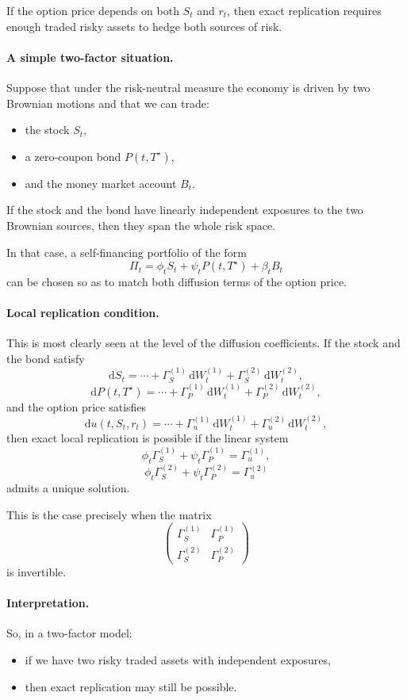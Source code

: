 \documentclass[11pt]{article}
\theoremstyle{plain}
\theoremstyle{definition}
\theoremstyle{remark}
\begin{document}
If the option price depends on both \(S_t\) and \(r_t\), then exact
replication requires enough traded risky assets to hedge both sources of
risk.

\paragraph{A simple two-factor situation.}
Suppose that under the risk-neutral measure the economy is driven by two
Brownian motions and that we can trade:
\begin{itemize}[leftmargin=1.4em]
    \item the stock \(S_t\),
    \item a zero-coupon bond \(P(t,T^\star)\),
    \item and the money market account \(B_t\).
\end{itemize}

If the stock and the bond have linearly independent exposures to the two
Brownian sources, then they span the whole risk space.

In that case, a self-financing portfolio of the form
\[
\Pi_t=\phi_t S_t+\psi_t P(t,T^\star)+\beta_t B_t
\]
can be chosen so as to match both diffusion terms of the option price.

\paragraph{Local replication condition.}
This is most clearly seen at the level of the diffusion coefficients.
If the stock and the bond satisfy
\[
\mathrm{d}S_t=\cdots+\Gamma_S^{(1)}\,\mathrm{d}W_t^{(1)}+\Gamma_S^{(2)}\,\mathrm{d}W_t^{(2)},
\]
\[
\mathrm{d}P(t,T^\star)=\cdots+\Gamma_P^{(1)}\,\mathrm{d}W_t^{(1)}+\Gamma_P^{(2)}\,\mathrm{d}W_t^{(2)},
\]
and the option price satisfies
\[
\mathrm{d}u(t,S_t,r_t)=\cdots+\Gamma_u^{(1)}\,\mathrm{d}W_t^{(1)}+\Gamma_u^{(2)}\,\mathrm{d}W_t^{(2)},
\]
then exact local replication is possible if the linear system
\[
\phi_t \Gamma_S^{(1)}+\psi_t \Gamma_P^{(1)}=\Gamma_u^{(1)},
\]
\[
\phi_t \Gamma_S^{(2)}+\psi_t \Gamma_P^{(2)}=\Gamma_u^{(2)}
\]
admits a unique solution.

This is the case precisely when the matrix
\[
\begin{pmatrix}
\Gamma_S^{(1)} & \Gamma_P^{(1)}\\
\Gamma_S^{(2)} & \Gamma_P^{(2)}
\end{pmatrix}
\]
is invertible.

\paragraph{Interpretation.}
So, in a two-factor model:
\begin{itemize}[leftmargin=1.4em]
    \item if we have two risky traded assets with independent exposures,
    \item then exact replication may still be possible.
\end{itemize}
\end{document}
